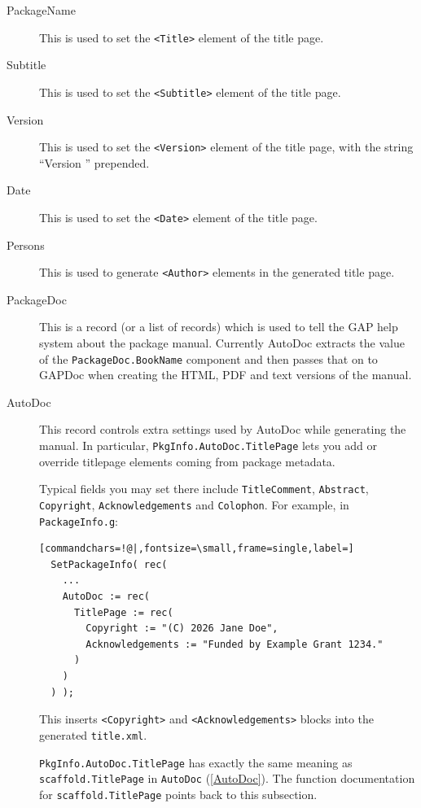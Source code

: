 \documentclass[a4paper,11pt]{report}
\begin{document}
{{{ 
\begin{description}
\item[{PackageName}]  This is used to set the \texttt{{\textless}Title{\textgreater}} element of the title page. 
\item[{Subtitle}]  This is used to set the \texttt{{\textless}Subtitle{\textgreater}} element of the title page. 
\item[{Version}]  This is used to set the \texttt{{\textless}Version{\textgreater}} element of the title page, with the string ``Version '' prepended. 
\item[{Date}]  This is used to set the \texttt{{\textless}Date{\textgreater}} element of the title page. 
\item[{Persons}]  This is used to generate \texttt{{\textless}Author{\textgreater}} elements in the generated title page. 
\item[{PackageDoc}]  This is a record (or a list of records) which is used to tell the \textsf{GAP} help system about the package manual. Currently \textsf{AutoDoc} extracts the value of the \texttt{PackageDoc.BookName} component and then passes that on to \textsf{GAPDoc} when creating the HTML, PDF and text versions of the manual. 
\item[{AutoDoc}]  This record controls extra settings used by \textsf{AutoDoc} while generating the manual. In particular, \texttt{PkgInfo.AutoDoc.TitlePage} lets you add or override title\texttt{}page elements coming from
package metadata. 

 Typical fields you may set there include \texttt{TitleComment}, \texttt{Abstract}, \texttt{Copyright}, \texttt{Acknowledgements} and \texttt{Colophon}. For example, in \texttt{PackageInfo.g}: 
\begin{Verbatim}[commandchars=!@|,fontsize=\small,frame=single,label=]
  SetPackageInfo( rec(
    ...
    AutoDoc := rec(
      TitlePage := rec(
        Copyright := "(C) 2026 Jane Doe",
        Acknowledgements := "Funded by Example Grant 1234."
      )
    )
  ) );
\end{Verbatim}
 This inserts \texttt{{\textless}Copyright{\textgreater}} and \texttt{{\textless}Acknowledgements{\textgreater}} blocks into the generated \texttt{title.xml}. 

 \texttt{PkgInfo.AutoDoc.TitlePage} has exactly the same meaning as \texttt{scaffold.TitlePage} in \texttt{AutoDoc} (\ref{AutoDoc}). The function documentation for \texttt{scaffold.TitlePage} points back to this subsection. 
\end{description}
 

}}}
\end{document}
